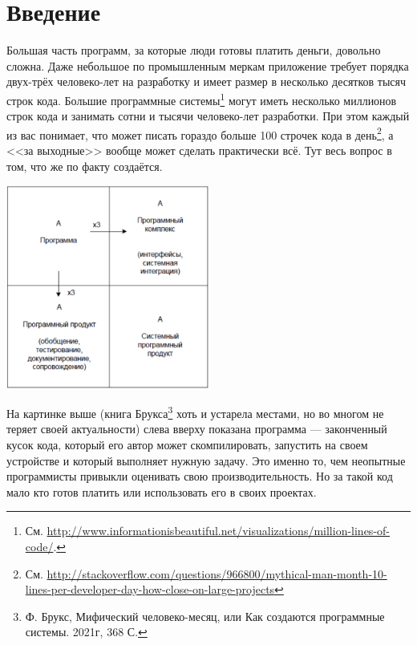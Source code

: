 \documentclass{../../text-style}
\begin{document}
\maketitle
\thispagestyle{empty}


\section{Введение}

Большая часть программ, за которые люди готовы платить деньги, довольно сложна. Даже небольшое по промышленным меркам приложение требует порядка двух-трёх человеко-лет на разработку и имеет размер в несколько десятков тысяч строк кода. Большие программные системы\footnote{См. \url{http://www.informationisbeautiful.net/visualizations/million-lines-of-code/}.} могут иметь несколько миллионов строк кода и занимать сотни и тысячи человеко-лет разработки. При этом каждый из вас понимает, что может писать гораздо больше 100 строчек кода в день\footnote{См. \url{http://stackoverflow.com/questions/966800/mythical-man-month-10-lines-per-developer-day-how-close-on-large-projects}}, а <<за выходные>> вообще может сделать практически всё. Тут весь вопрос в том, что же по факту создаётся.

\begin{center}
    \includegraphics[width=0.5\textwidth]{brooksSquare.png}
\end{center}

На картинке выше (книга Брукса\footnote{Ф. Брукс, Мифический человеко-месяц, или Как создаются программные системы. 2021г, 368 С.} хоть и устарела местами, но во многом не теряет своей актуальности) слева вверху показана программа --- законченный кусок кода, который его автор может скомпилировать, запустить на своем устройстве и который выполняет нужную задачу. Это именно то, чем неопытные программисты привыкли оценивать свою производительность. Но за такой код мало кто готов платить или использовать его в своих проектах.
\end{document}
